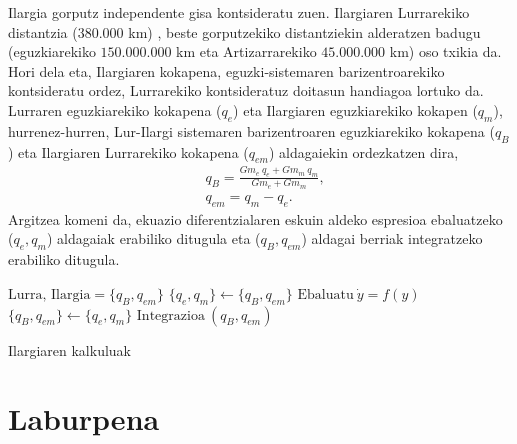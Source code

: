 Ilargia gorputz independente gisa kontsideratu zuen. Ilargiaren Lurrarekiko distantzia ($380.000$ km) , beste gorputzekiko distantziekin alderatzen badugu (eguzkiarekiko $150.000.000$ km eta Artizarrarekiko $45.000.000$ km) oso txikia da. Hori dela eta, Ilargiaren kokapena, eguzki-sistemaren barizentroarekiko kontsideratu ordez, Lurrarekiko kontsideratuz doitasun handiagoa lortuko da. Lurraren eguzkiarekiko kokapena ($q_e$) eta Ilargiaren eguzkiarekiko kokapen ($q_m$), hurrenez-hurren, Lur-Ilargi sistemaren barizentroaren eguzkiarekiko kokapena ($q_B$) eta  Ilargiaren Lurrarekiko kokapena ($q_{em}$) aldagaiekin ordezkatzen dira,
\begin{align*}
& q_B =\frac{Gm_e \ q_e+Gm_m \ q_m}{Gm_e+Gm_m},\\
& q_{em} =q_m-q_e.
\end{align*}
Argitzea komeni da, ekuazio diferentzialaren eskuin aldeko espresioa ebaluatzeko ($q_e,q_m$) aldagaiak erabiliko ditugula eta ($q_B,q_{em}$) aldagai berriak  integratzeko erabiliko ditugula.

\begin{algorithm}[H]
 \BlankLine
  $\mbox{Lurra, Ilargia}=\{q_B,q_{em}\}$\;
  {
   \BlankLine
     $\{q_e,q_m\} \leftarrow \{q_B,q_{em}\} $\;
     $\mbox{Ebaluatu} \ \dot{y}=f(y)$\;
     $ \{q_B,q_{em}\} \leftarrow \{q_e,q_m\} $\;
     $\mbox{Integrazioa}\ (q_B,q_{em})$\;
   \BlankLine
  }
 \caption{Ilargiaren kalkuluak}
\end{algorithm}

\begin{table}[h]
\caption[Ilargiaren Lurrarekiko hasierako balioak]{Ilargiaren Lurrarekiko hasierako balioak}
\label{tab:1}       %
\centering
{}
\end{table}     
          

\section{Laburpena}

